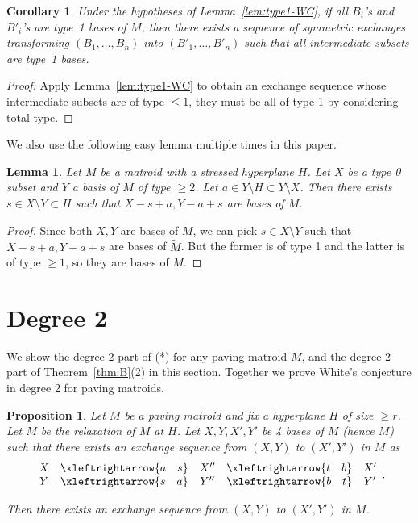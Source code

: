 \documentclass{amsart}
\newtheorem{lemma}[theorem]{Lemma}
\newtheorem{proposition}[theorem]{Proposition}
\newtheorem{corollary}[theorem]{Corollary}
\newcommand{\swap}[2]{\xleftrightarrow{#1 \quad #2}}
\begin{document}
\begin{corollary}\label{cor:type1-WC-bases}
    Under the hypotheses of Lemma~\ref{lem:type1-WC}, if all $B_i$'s and $B'_i$'s are type~1 \emph{bases} of $M$, then there exists a sequence of symmetric exchanges transforming $(B_1,\dots,B_n)$ into $(B'_1,\dots,B'_n)$ such that all intermediate subsets are type~1 bases.
\end{corollary}

\begin{proof}
    Apply Lemma~\ref{lem:type1-WC} to obtain an exchange sequence whose intermediate subsets are of type $\leq 1$, they must be all of type 1 by considering total type.
\end{proof}

We also use the following easy lemma multiple times in this paper.

\begin{lemma} \label{lem:type02}
    Let $M$ be a matroid with a stressed hyperplane $H$.
    Let $X$ be a type 0 subset and $Y$ a basis of $M$ of type $\geq 2$. Let $a\in Y\setminus H\subset Y\setminus X$. Then there exists $s\in X\setminus Y\subset H$  such that $X-s+a, Y-a+s$ are bases of $M$.
\end{lemma}

\begin{proof}
    Since both $X,Y$ are bases of $\widetilde{M}$, we can pick $s\in X\setminus Y$ such that $X-s+a, Y-a+s$ are bases of $\widetilde{M}$. But the former is of type 1 and the latter is of type $\geq 1$, so they are bases of $M$.
\end{proof}


\section{Degree 2} \label{sec:deg2}

We show the degree 2 part of (*) for any paving matroid $M$, and the degree 2 part of Theorem~\ref{thm:B}(2) in this section. Together we prove White's conjecture in degree 2 for paving matroids.

\begin{proposition} \label{prop:XY_XY}
    Let $M$ be a paving matroid and fix a hyperplane $H$ of size $\geq r$. Let $\widetilde{M}$ be the relaxation of $M$ at $H$. Let $X,Y,X',Y'$ be 4 bases of $M$ (hence $\widetilde{M}$) such that there exists an exchange sequence from $(X,Y)$ to $(X',Y')$ in $\widetilde{M}$ as
\begin{equation} \label{eq:deg2}
\begin{array}{c c c c c}
   X   & \swap{a}{s} & X'' & \swap{t}{b} & X'\\
   Y   & \swap{s}{a} & Y'' & \swap{b}{t} & Y'
\end{array}.
\end{equation}


Then there exists an exchange sequence from $(X,Y)$ to $(X',Y')$ in $M$.
\end{proposition} 
\end{document}
